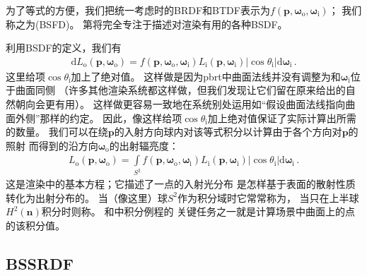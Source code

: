 为了等式的方便，我们把统一考虑时的BRDF和BTDF表示为$f({\bm p},{\bm \omega}_\mathrm{o},{\bm \omega}_\mathrm{i})$；
我们称之为(BSFD)。
第将完全专注于描述对渲染有用的各种BSDF。

利用BSDF的定义，我们有
\begin{align*}
    \mathrm{d}L_{\mathrm{o}}({\bm p},{\bm\omega}_{\mathrm{o}})=f({\bm p},{\bm \omega}_\mathrm{o},{\bm \omega}_\mathrm{i})L_{\mathrm{i}}({\bm p},{\bm\omega}_{\mathrm{i}})|\cos\theta_{\mathrm{i}}|\mathrm{d}{\bm\omega}_{\mathrm{i}}\, .
\end{align*}
这里给项$\cos\theta_{\mathrm{i}}$加上了绝对值。
这样做是因为pbrt中曲面法线并没有调整为和${\bm\omega}_{\mathrm{i}}$位于曲面同侧
（许多其他渲染系统都这样做，但我们发现让它们留在原来给出的自然朝向会更有用）。
这样做更容易一致地在系统别处运用如“假设曲面法线指向曲面外侧”那样的约定。
因此，像这样给项$\cos\theta_{\mathrm{i}}$加上绝对值保证了实际计算出所需的数量。
我们可以在绕$\bm p$的入射方向球内对该等式积分以计算由于各个方向对$\bm p$的照射
而得到的沿方向${\bm\omega}_{\mathrm{o}}$的出射辐亮度：
\begin{align}\label{eq:5.9}
    L_{\mathrm{o}}({\bm p},{\bm\omega}_{\mathrm{o}})=\int\limits_{S^2}f({\bm p},{\bm \omega}_\mathrm{o},{\bm \omega}_\mathrm{i})L_{\mathrm{i}}({\bm p},{\bm\omega}_{\mathrm{i}})|\cos\theta_{\mathrm{i}}|\mathrm{d}{\bm\omega}_{\mathrm{i}}\, .
\end{align}
这是渲染中的基本方程；它描述了一点的入射光分布
是怎样基于表面的散射性质转化为出射分布的。
当（像这里）球$S^2$作为积分域时它常常称为，
当只在上半球$H^2({\bm n})$积分时则称。
和中积分例程的
关键任务之一就是计算场景中曲面上的点的该积分值。

\subsection{BSSRDF}\label{sub:BSSRDF}
